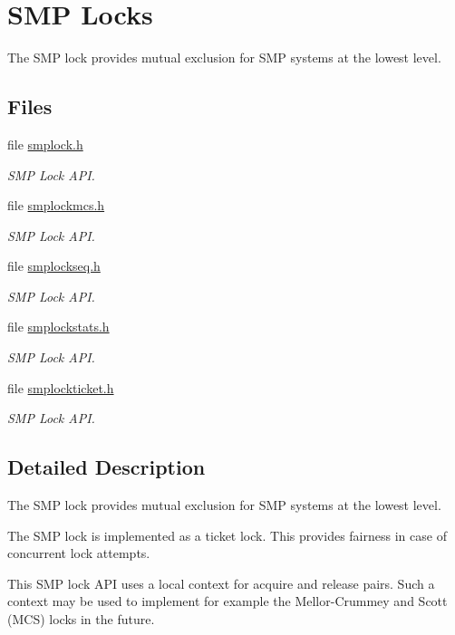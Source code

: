 \hypertarget{group__RTEMSScoreSMPLock}{}\section{S\+MP Locks}
\label{group__RTEMSScoreSMPLock}


The S\+MP lock provides mutual exclusion for S\+MP systems at the lowest level.  


\subsection*{Files}
\begin{DoxyCompactItemize}
\item 
file \mbox{\hyperlink{smplock_8h}{smplock.\+h}}
\begin{DoxyCompactList}\small\item\em S\+MP Lock A\+PI. \end{DoxyCompactList}\item 
file \mbox{\hyperlink{smplockmcs_8h}{smplockmcs.\+h}}
\begin{DoxyCompactList}\small\item\em S\+MP Lock A\+PI. \end{DoxyCompactList}\item 
file \mbox{\hyperlink{smplockseq_8h}{smplockseq.\+h}}
\begin{DoxyCompactList}\small\item\em S\+MP Lock A\+PI. \end{DoxyCompactList}\item 
file \mbox{\hyperlink{smplockstats_8h}{smplockstats.\+h}}
\begin{DoxyCompactList}\small\item\em S\+MP Lock A\+PI. \end{DoxyCompactList}\item 
file \mbox{\hyperlink{smplockticket_8h}{smplockticket.\+h}}
\begin{DoxyCompactList}\small\item\em S\+MP Lock A\+PI. \end{DoxyCompactList}\end{DoxyCompactItemize}


\subsection{Detailed Description}
The S\+MP lock provides mutual exclusion for S\+MP systems at the lowest level. 

The S\+MP lock is implemented as a ticket lock. This provides fairness in case of concurrent lock attempts.

This S\+MP lock A\+PI uses a local context for acquire and release pairs. Such a context may be used to implement for example the Mellor-\/\+Crummey and Scott (M\+CS) locks in the future. 